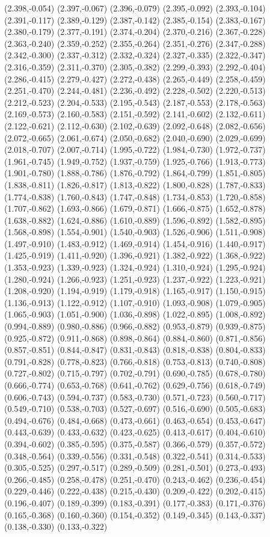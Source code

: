 (2.398,-0.054) (2.397,-0.067) (2.396,-0.079) (2.395,-0.092) (2.393,-0.104) (2.391,-0.117) (2.389,-0.129) (2.387,-0.142) (2.385,-0.154) (2.383,-0.167) (2.380,-0.179) (2.377,-0.191) (2.374,-0.204) (2.370,-0.216) (2.367,-0.228) (2.363,-0.240) (2.359,-0.252) (2.355,-0.264) (2.351,-0.276) (2.347,-0.288) (2.342,-0.300) (2.337,-0.312) (2.332,-0.324) (2.327,-0.335) (2.322,-0.347) (2.316,-0.359) (2.311,-0.370) (2.305,-0.382) (2.299,-0.393) (2.292,-0.404) (2.286,-0.415) (2.279,-0.427) (2.272,-0.438) (2.265,-0.449) (2.258,-0.459) (2.251,-0.470) (2.244,-0.481) (2.236,-0.492) (2.228,-0.502) (2.220,-0.513) (2.212,-0.523) (2.204,-0.533) (2.195,-0.543) (2.187,-0.553) (2.178,-0.563) (2.169,-0.573) (2.160,-0.583) (2.151,-0.592) (2.141,-0.602) (2.132,-0.611) (2.122,-0.621) (2.112,-0.630) (2.102,-0.639) (2.092,-0.648) (2.082,-0.656) (2.072,-0.665) (2.061,-0.674) (2.050,-0.682) (2.040,-0.690) (2.029,-0.699) (2.018,-0.707) (2.007,-0.714) (1.995,-0.722) (1.984,-0.730) (1.972,-0.737) (1.961,-0.745) (1.949,-0.752) (1.937,-0.759) (1.925,-0.766) (1.913,-0.773) (1.901,-0.780) (1.888,-0.786) (1.876,-0.792) (1.864,-0.799) (1.851,-0.805) (1.838,-0.811) (1.826,-0.817) (1.813,-0.822) (1.800,-0.828) (1.787,-0.833) (1.774,-0.838) (1.760,-0.843) (1.747,-0.848) (1.734,-0.853) (1.720,-0.858) (1.707,-0.862) (1.693,-0.866) (1.679,-0.871) (1.666,-0.875) (1.652,-0.878) (1.638,-0.882) (1.624,-0.886) (1.610,-0.889) (1.596,-0.892) (1.582,-0.895) (1.568,-0.898) (1.554,-0.901) (1.540,-0.903) (1.526,-0.906) (1.511,-0.908) (1.497,-0.910) (1.483,-0.912) (1.469,-0.914) (1.454,-0.916) (1.440,-0.917) (1.425,-0.919) (1.411,-0.920) (1.396,-0.921) (1.382,-0.922) (1.368,-0.922) (1.353,-0.923) (1.339,-0.923) (1.324,-0.924) (1.310,-0.924) (1.295,-0.924) (1.280,-0.924) (1.266,-0.923) (1.251,-0.923) (1.237,-0.922) (1.223,-0.921) (1.208,-0.920) (1.194,-0.919) (1.179,-0.918) (1.165,-0.917) (1.150,-0.915) (1.136,-0.913) (1.122,-0.912) (1.107,-0.910) (1.093,-0.908) (1.079,-0.905) (1.065,-0.903) (1.051,-0.900) (1.036,-0.898) (1.022,-0.895) (1.008,-0.892) (0.994,-0.889) (0.980,-0.886) (0.966,-0.882) (0.953,-0.879) (0.939,-0.875) (0.925,-0.872) (0.911,-0.868) (0.898,-0.864) (0.884,-0.860) (0.871,-0.856) (0.857,-0.851) (0.844,-0.847) (0.831,-0.843) (0.818,-0.838) (0.804,-0.833) (0.791,-0.828) (0.778,-0.823) (0.766,-0.818) (0.753,-0.813) (0.740,-0.808) (0.727,-0.802) (0.715,-0.797) (0.702,-0.791) (0.690,-0.785) (0.678,-0.780) (0.666,-0.774) (0.653,-0.768) (0.641,-0.762) (0.629,-0.756) (0.618,-0.749) (0.606,-0.743) (0.594,-0.737) (0.583,-0.730) (0.571,-0.723) (0.560,-0.717) (0.549,-0.710) (0.538,-0.703) (0.527,-0.697) (0.516,-0.690) (0.505,-0.683) (0.494,-0.676) (0.484,-0.668) (0.473,-0.661) (0.463,-0.654) (0.453,-0.647) (0.443,-0.639) (0.433,-0.632) (0.423,-0.625) (0.413,-0.617) (0.404,-0.610) (0.394,-0.602) (0.385,-0.595) (0.375,-0.587) (0.366,-0.579) (0.357,-0.572) (0.348,-0.564) (0.339,-0.556) (0.331,-0.548) (0.322,-0.541) (0.314,-0.533) (0.305,-0.525) (0.297,-0.517) (0.289,-0.509) (0.281,-0.501) (0.273,-0.493) (0.266,-0.485) (0.258,-0.478) (0.251,-0.470) (0.243,-0.462) (0.236,-0.454) (0.229,-0.446) (0.222,-0.438) (0.215,-0.430) (0.209,-0.422) (0.202,-0.415) (0.196,-0.407) (0.189,-0.399) (0.183,-0.391) (0.177,-0.383) (0.171,-0.376) (0.165,-0.368) (0.160,-0.360) (0.154,-0.352) (0.149,-0.345) (0.143,-0.337) (0.138,-0.330) (0.133,-0.322) 